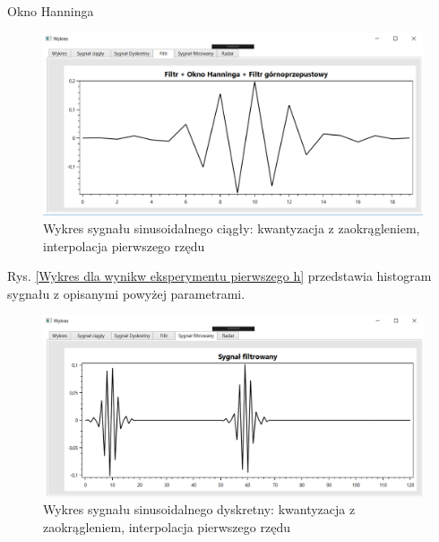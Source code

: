\documentclass[12pt]{article}
\begin{document}
\newpage
Okno Hanninga
\begin{figure}[h!]
 \centering
 \includegraphics[width=12.3cm]{prostFGOHn.PNG}
 \vspace{-0.3cm}
 \caption{Wykres sygnału sinusoidalnego ciągły: kwantyzacja z zaokrągleniem, interpolacja pierwszego rzędu}
 \label{Wykres dla wyników eksperymentu drugiego}
\end{figure}
\newpage
Rys. \ref{Wykres dla wynikw eksperymentu pierwszego h} przedstawia histogram sygnału z opisanymi powyżej parametrami. 
\begin{figure}[h!]
 \centering
 \includegraphics[width=12.3cm]{prostSFGHn.PNG}
 \vspace{-0.3cm}
 \caption{Wykres sygnału sinusoidalnego dyskretny: kwantyzacja z zaokrągleniem, interpolacja pierwszego rzędu}
 \label{Histogram dla wyników eksperymentu drugiego}
\end{figure}
\end{document}
